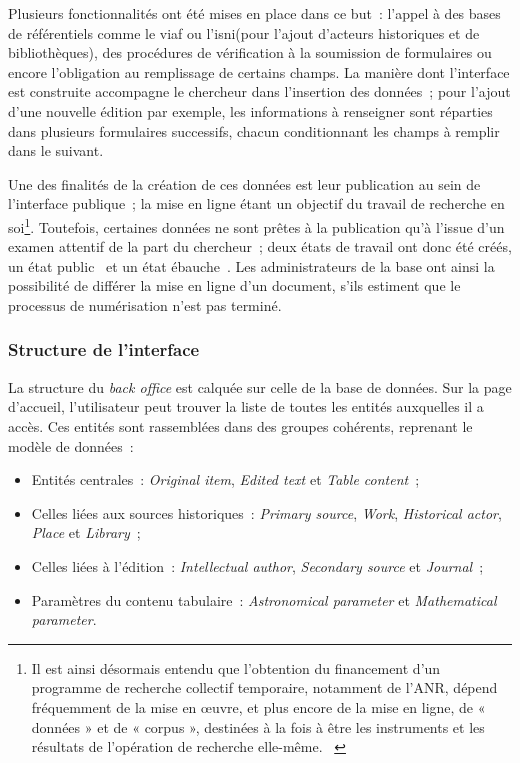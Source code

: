 \documentclass[a4paper,12pt,twoside]{book}
\newcommand{\eng}{\emph}
\newcommand{\Oi}{\eng{Original item}\xspace}
\newcommand{\bdd}{base de données\xspace}
\newcommand{\g}[1]{\og#1~\fg}
\newcommand{\viaf}{\gls{viaf}\xspace}
\newcommand{\isni}{\gls{isni}\xspace}
\begin{document}
Plusieurs fonctionnalités ont été mises en place dans ce but~: l'appel à des bases de référentiels comme le \viaf ou l'\isni (pour l'ajout d'acteurs historiques et de bibliothèques), des procédures de vérification à la soumission de formulaires ou encore l'obligation au remplissage de certains champs. La manière dont l'interface est construite accompagne le chercheur dans l'insertion des données~; pour l'ajout d'une nouvelle édition par exemple, les informations à renseigner sont réparties dans plusieurs formulaires successifs, chacun conditionnant les champs à remplir dans le suivant.

Une des finalités de la création de ces données est leur publication au sein de l'interface publique~; la mise en ligne étant un objectif du travail de recherche en soi\footnote{\g{Il est ainsi désormais entendu que l’obtention du financement d’un programme de recherche collectif temporaire, notamment de l’ANR, dépend fréquemment de la mise en œuvre, et plus encore de la mise en ligne, de « données » et de « corpus », destinées à la fois à être les instruments et les résultats de l’opération de recherche elle-même.} \cite[§~2]{potinInstitutionsPratiquesArchives2011}}. Toutefois, certaines données ne sont prêtes à la publication qu'à l'issue d'un examen attentif de la part du chercheur~; deux états de travail ont donc été créés, un état \g{public} et un état \g{ébauche}. Les administrateurs de la base ont ainsi la possibilité de différer la mise en ligne d'un document, s'ils estiment que le processus de numérisation n'est pas terminé.

			\subsubsection{Structure de l'interface}
La structure du \eng{back office} est calquée sur celle de la \bdd. Sur la page d'accueil, l'utilisateur peut trouver la liste de toutes les entités auxquelles il a accès. Ces entités sont rassemblées dans des groupes cohérents, reprenant le modèle de données~:

\begin{itemize}
	\item Entités centrales~: \Oi, \eng{Edited text} et \eng{Table content}~;
	\item Celles liées aux sources historiques~: \eng{Primary source}, \eng{Work}, \eng{Historical actor}, \eng{Place} et \eng{Library}~;
	\item Celles liées à l'édition~: \eng{Intellectual author}, \eng{Secondary source} et \eng{Journal}~;
	\item Paramètres du contenu tabulaire~: \eng{Astronomical parameter} et \eng{Mathematical parameter}.
\end{itemize}
\end{document}
